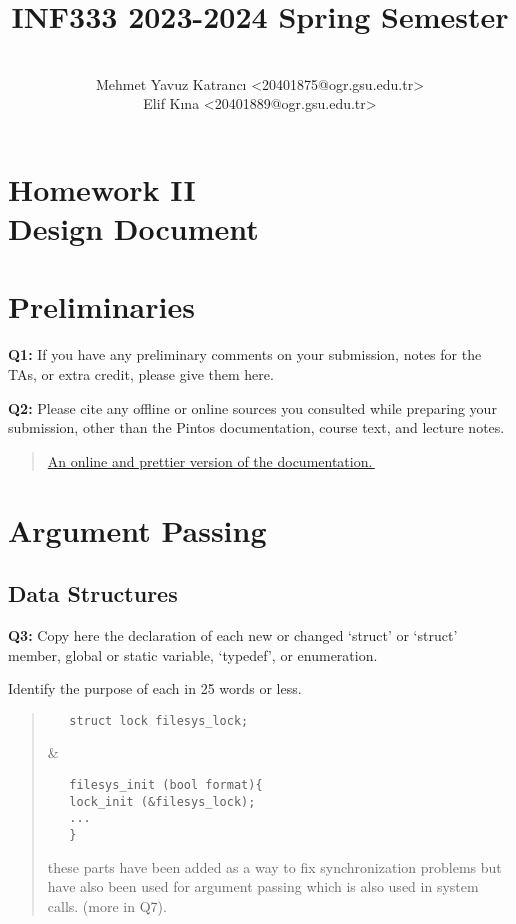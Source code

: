 \documentclass[a4paper,11pt]{paper}
\title{INF333 2023-2024 Spring Semester}
\author{
\textbf{\color{few-purple-bright}{Çiçekler}} 
\\ Mehmet Yavuz Katrancı <20401875@ogr.gsu.edu.tr>
\\ Elif Kına <20401889@ogr.gsu.edu.tr>}
\let\orighref\href
\renewcommand{\href}[2]{\orighref{#1}{#2\,\smaller[4]\faExternalLink}}
\begin{document}
\maketitle

\section*{\LARGE Homework II \\
  Design Document}


\section{Preliminaries}

\textbf{Q1:} If you have any preliminary comments on your submission, notes for the TAs, or extra credit, please give them here.
\begin{quote}
  
\end{quote}


\textbf{Q2:} Please cite any offline or online sources you consulted while preparing your
submission, other than the Pintos documentation, course text, and lecture notes.
\begin{quote}
  \href{https://pkuflyingpig.gitbook.io/pintos/project-description/lab2-user-programs}{An online and prettier version of the documentation.}
\end{quote}


\section{Argument Passing}

\subsection{Data Structures}

\textbf{Q3:} Copy here the declaration of each new or changed `struct' or `struct' member, global or static variable, `typedef', or enumeration.

Identify the purpose of each in 25 words or less.
\begin{quote}
  \begin{verbatim}
   struct lock filesys_lock;
  \end{verbatim}
  \&
  \begin{verbatim}
   filesys_init (bool format){
   lock_init (&filesys_lock);
   ...
   }
  \end{verbatim}
  these parts have been added as a way to fix synchronization problems but have also been used for argument passing which is also used in system calls. (more in Q7).
\end{quote}
\end{document}
